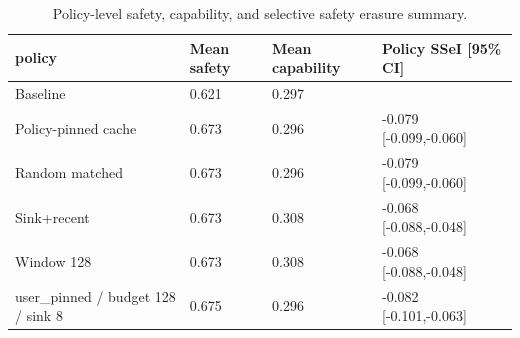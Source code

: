 \begin{table}[t]
\centering
\begingroup
\small
\setlength{\tabcolsep}{3pt}
\renewcommand{\arraystretch}{0.94}
\begin{tabularx}{\linewidth}{@{}lXXX@{}}
\toprule
policy & Mean safety & Mean capability & Policy SSeI [95\% CI] \\
\midrule
Baseline & 0.621 & 0.297 &  \\
Policy-pinned cache & 0.673 & 0.296 & -0.079 [-0.099,-0.060] \\
Random matched & 0.673 & 0.296 & -0.079 [-0.099,-0.060] \\
Sink+recent & 0.673 & 0.308 & -0.068 [-0.088,-0.048] \\
Window 128 & 0.673 & 0.308 & -0.068 [-0.088,-0.048] \\
user\_pinned / budget 128 / sink 8 & 0.675 & 0.296 & -0.082 [-0.101,-0.063] \\
\bottomrule
\end{tabularx}
\endgroup
\caption{Policy-level safety, capability, and selective safety erasure summary.}
\label{tab:main-results}
\end{table}
